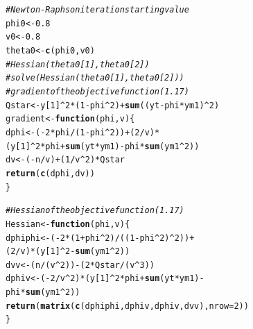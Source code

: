 \documentclass[12pt]{article}\usepackage[]{graphicx}\usepackage[]{color}
\makeatletter
\newcommand{\hlnum}[1]{\textcolor[rgb]{0.686,0.059,0.569}{#1}}%
\newcommand{\hlcom}[1]{\textcolor[rgb]{0.678,0.584,0.686}{\textit{#1}}}%
\newcommand{\hlopt}[1]{\textcolor[rgb]{0,0,0}{#1}}%
\newcommand{\hlstd}[1]{\textcolor[rgb]{0.345,0.345,0.345}{#1}}%
\newcommand{\hlkwa}[1]{\textcolor[rgb]{0.161,0.373,0.58}{\textbf{#1}}}%
\newcommand{\hlkwb}[1]{\textcolor[rgb]{0.69,0.353,0.396}{#1}}%
\newcommand{\hlkwc}[1]{\textcolor[rgb]{0.333,0.667,0.333}{#1}}%
\newcommand{\hlkwd}[1]{\textcolor[rgb]{0.737,0.353,0.396}{\textbf{#1}}}%
\newenvironment{kframe}{%
 \def\at@end@of@kframe{}%
 \ifinner\ifhmode%
  \def\at@end@of@kframe{\end{minipage}}%
  \begin{minipage}{\columnwidth}%
 \fi\fi%
 \def\FrameCommand##1{\hskip\@totalleftmargin \hskip-\fboxsep
 \colorbox{shadecolor}{##1}\hskip-\fboxsep
     \hskip-\linewidth \hskip-\@totalleftmargin \hskip\columnwidth}%
 \MakeFramed {\advance\hsize-\width
   \@totalleftmargin\z@ \linewidth\hsize
   \@setminipage}}%
 {\par\unskip\endMakeFramed%
 \at@end@of@kframe}
\newenvironment{knitrout}{}{} %
\makeatother
\begin{document}
\begin{knitrout}
\begin{kframe}
\begin{alltt}
\hlcom{# Newton-Raphson iteration starting value}
\hlstd{phi0} \hlkwb{<-} \hlnum{0.8}
\hlstd{v0} \hlkwb{<-} \hlnum{0.8}
\hlstd{theta0} \hlkwb{<-} \hlkwd{c}\hlstd{(phi0, v0)}
\hlcom{# Hessian(theta0[1], theta0[2])}
\hlcom{# solve(Hessian(theta0[1], theta0[2]))}
\hlcom{# gradient of the objective function (1.17)}
\hlstd{Qstar} \hlkwb{<-} \hlstd{y[}\hlnum{1}\hlstd{]} \hlopt{^} \hlnum{2} \hlopt{*} \hlstd{(}\hlnum{1} \hlopt{-} \hlstd{phi} \hlopt{^} \hlnum{2}\hlstd{)} \hlopt{+} \hlkwd{sum}\hlstd{((yt} \hlopt{-} \hlstd{phi} \hlopt{*} \hlstd{ym1)} \hlopt{^} \hlnum{2}\hlstd{)}
\hlstd{gradient} \hlkwb{<-} \hlkwa{function}\hlstd{(}\hlkwc{phi}\hlstd{,} \hlkwc{v}\hlstd{) \{}
    \hlstd{dphi} \hlkwb{<-} \hlstd{(}\hlopt{-}\hlnum{2} \hlopt{*} \hlstd{phi} \hlopt{/} \hlstd{(}\hlnum{1} \hlopt{-} \hlstd{phi} \hlopt{^} \hlnum{2}\hlstd{))} \hlopt{+} \hlstd{(}\hlnum{2} \hlopt{/} \hlstd{v)} \hlopt{*}
        \hlstd{(y[}\hlnum{1}\hlstd{]} \hlopt{^} \hlnum{2} \hlopt{*} \hlstd{phi} \hlopt{+} \hlkwd{sum}\hlstd{(yt} \hlopt{*} \hlstd{ym1)} \hlopt{-} \hlstd{phi} \hlopt{*} \hlkwd{sum}\hlstd{(ym1} \hlopt{^} \hlnum{2}\hlstd{))}
    \hlstd{dv} \hlkwb{<-} \hlstd{(}\hlopt{-}\hlstd{n} \hlopt{/} \hlstd{v)} \hlopt{+} \hlstd{(}\hlnum{1} \hlopt{/} \hlstd{v} \hlopt{^} \hlnum{2}\hlstd{)} \hlopt{*} \hlstd{Qstar}
    \hlkwd{return} \hlstd{(}\hlkwd{c}\hlstd{(dphi, dv))}
\hlstd{\}}

\hlcom{# Hessian of the objective function (1.17)}
\hlstd{Hessian} \hlkwb{<-} \hlkwa{function}\hlstd{(}\hlkwc{phi}\hlstd{,} \hlkwc{v}\hlstd{) \{}
    \hlstd{dphiphi} \hlkwb{<-} \hlstd{(}\hlopt{-}\hlnum{2} \hlopt{*} \hlstd{(}\hlnum{1} \hlopt{+} \hlstd{phi} \hlopt{^} \hlnum{2}\hlstd{)} \hlopt{/} \hlstd{((}\hlnum{1} \hlopt{-} \hlstd{phi} \hlopt{^} \hlnum{2}\hlstd{)} \hlopt{^} \hlnum{2}\hlstd{))} \hlopt{+}
        \hlstd{(}\hlnum{2} \hlopt{/} \hlstd{v)} \hlopt{*} \hlstd{(y[}\hlnum{1}\hlstd{]} \hlopt{^} \hlnum{2} \hlopt{-} \hlkwd{sum}\hlstd{(ym1} \hlopt{^} \hlnum{2}\hlstd{))}
    \hlstd{dvv} \hlkwb{<-} \hlstd{(n} \hlopt{/} \hlstd{(v} \hlopt{^} \hlnum{2}\hlstd{))} \hlopt{-} \hlstd{(}\hlnum{2} \hlopt{*} \hlstd{Qstar} \hlopt{/} \hlstd{(v} \hlopt{^} \hlnum{3}\hlstd{))}
    \hlstd{dphiv} \hlkwb{<-} \hlstd{(}\hlopt{-}\hlnum{2} \hlopt{/} \hlstd{v} \hlopt{^} \hlnum{2}\hlstd{)} \hlopt{*} \hlstd{(y[}\hlnum{1}\hlstd{]} \hlopt{^} \hlnum{2}\hlopt{*} \hlstd{phi} \hlopt{+} \hlkwd{sum}\hlstd{(yt} \hlopt{*} \hlstd{ym1)} \hlopt{-}
                                \hlstd{phi} \hlopt{*} \hlkwd{sum}\hlstd{(ym1} \hlopt{^} \hlnum{2}\hlstd{))}
    \hlkwd{return} \hlstd{(}\hlkwd{matrix}\hlstd{(}\hlkwd{c}\hlstd{(dphiphi, dphiv, dphiv, dvv),} \hlkwc{nrow} \hlstd{=} \hlnum{2}\hlstd{))}
\hlstd{\}}


\end{alltt}
\end{kframe}
\end{knitrout}
\end{document}
